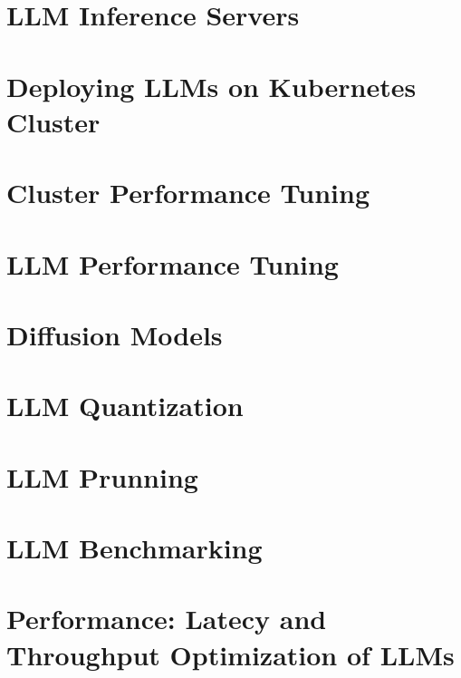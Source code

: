 \documentclass[12pt]{book}
\begin{document}
\chapter{LLM Inference Servers}


\chapter{Deploying LLMs on Kubernetes Cluster}


\chapter{Cluster Performance Tuning}


\chapter{LLM Performance Tuning}


\chapter{Diffusion Models}


\chapter{LLM Quantization}


\chapter{LLM Prunning}


\chapter{LLM Benchmarking}


\chapter{Performance: Latecy and Throughput Optimization of LLMs}

\end{document}
